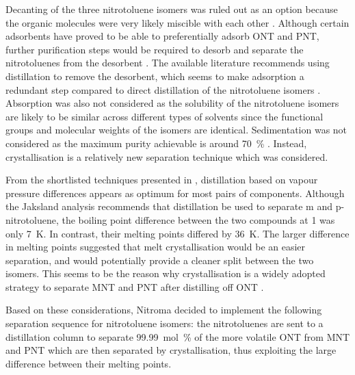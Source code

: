 Decanting of the three nitrotoluene isomers was ruled out as an option because the organic molecules were very likely miscible with each other \cite{merck_solvent_2021}. Although certain adsorbents have proved to be able to preferentially adsorb ONT and PNT, further purification steps would be required to desorb and separate the nitrotoluenes from the desorbent \cite{zhao_new_2016}. The available literature recommends using distillation to remove the desorbent, which seems to make adsorption a redundant step compared to direct distillation of the nitrotoluene isomers \cite{zinnen_ep0181106a2_1984}. Absorption was also not considered as the solubility of the nitrotoluene isomers are likely to be similar across different types of solvents since the functional groups and molecular weights of the isomers are identical. Sedimentation was not considered as the maximum purity achievable is around \SI{70}{\percent} \cite{seider_product_2009}. Instead, crystallisation is a relatively new separation technique which was considered. 

From the shortlisted techniques presented in , distillation based on vapour pressure differences appears as optimum for most pairs of components. Although the Jaksland analysis recommends that distillation be used to separate m and p-nitrotoluene, the boiling point difference between the two compounds at \SI{1}{\atm} was only \SI{7}{\K}. In contrast, their melting points differed by \SI{36}{\K}. The larger difference in melting points suggested that melt crystallisation would be an easier separation, and would potentially provide a cleaner split between the two isomers. This seems to be the reason why crystallisation is a widely adopted strategy to separate MNT and PNT after distilling off ONT \cite{weiland_purification_1931,european_chemical_agency_background_2010}. 

Based on these considerations, Nitroma decided to implement the following separation sequence for nitrotoluene isomers: the nitrotoluenes are sent to a distillation column to separate \SI{99.99}{mol\percent} of the more volatile ONT from MNT and PNT which are then separated by crystallisation, thus exploiting the large difference between their melting points.

